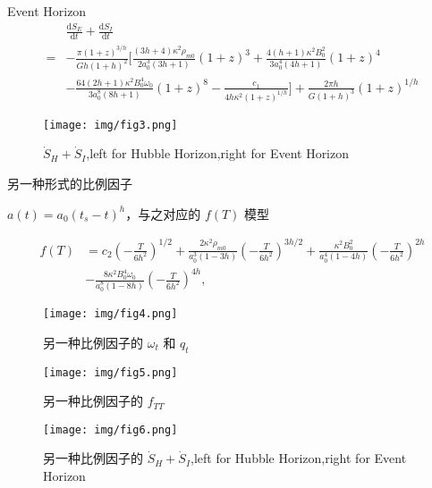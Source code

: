 \documentclass[9pt, dvipsnames]{beamer} %
\begin{document}
\begin{frame}{Event Horizon}
    $$
    \begin{aligned}
        &\frac{\mathrm{d}S_E }{\mathrm{d}t } + \frac{\mathrm{d}S_I }{\mathrm{d}t } \\
        =&-\frac{\pi(1+z)^{3/h} }{Gh(1+h)^2 } \bigg[\frac{(3h+4)\kappa^2\rho_{m0} }{2a_0^3(3h+1) }(1+z)^3 + \frac{4(h+1)\kappa^2 B_0^2 }{3a_0^4(4h+1) } (1+z)^4 \\
        &- \frac{64(2h+1)\kappa^2 B_0^4 \omega_0 }{3a_0^8 (8h+1) } (1+z)^8 - \frac{c_1 }{4h\kappa^2(1+z)^{1/h} } \bigg] + \frac{2\pi h }{G (1+h)^3 } (1+z)^{1/h}
    \end{aligned}
    $$

    \begin{figure}
        \centering
        \texttt{[image: img/fig3.png]}
        \caption{$\dot{S}_H+\dot{S}_I$,left for Hubble Horizon,right for Event Horizon}
    \end{figure}
\end{frame}

\begin{frame}{另一种形式的比例因子}

    $a(t)=a_0(t_s-t)^h$，与之对应的 $f(T)$ 模型
    
    $$
    \begin{aligned}
        f(T)
        &=c_2\left(-\frac{T }{6h^2 }  \right)^{1/2} + \frac{2\kappa^2\rho_{m0} }{a_0^3(1-3h) } \left(-\frac{T }{6h^2 }  \right)^{3h/2} + \frac{\kappa^2 B_0^2 }{a_0^4(1-4h) } \left(-\frac{T }{6h^2 }  \right)^{2h} \\
        &- \frac{8\kappa^2 B_0^4 \omega_0 }{a_0^8(1-8h) } \left(-\frac{T }{6h^2 }  \right)^{4h},
    \end{aligned}
    $$
    \begin{figure}
        \centering
        \texttt{[image: img/fig4.png]}
        \caption{另一种比例因子的 $\omega_t$ 和 $q_t$}
    \end{figure}
\end{frame}
    
\begin{frame}
    \begin{figure}
        \centering
        \texttt{[image: img/fig5.png]}
        \caption{另一种比例因子的 $f_{TT}$}
    \end{figure}
    \begin{figure}
        \centering
        \texttt{[image: img/fig6.png]}
        \caption{另一种比例因子的 $\dot{S}_H+\dot{S}_I$,left for Hubble Horizon,right for Event Horizon}
    \end{figure}
\end{frame}
\end{document}
